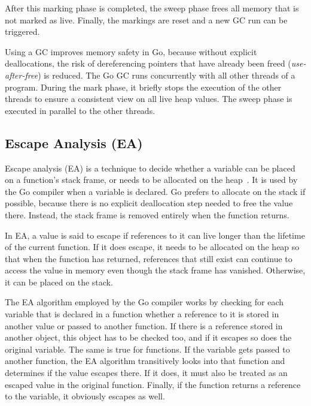 After this marking phase is completed, the sweep phase frees all memory that is not marked as live.
Finally, the markings are reset and a new \acrshort{GC} run can be triggered.

Using a \acrshort{GC} improves memory safety in Go, because without explicit deallocations, the risk of dereferencing
pointers that have already been freed (\textit{use-after-free}) is reduced.
The Go GC runs concurrently with all other threads of a program.
During the mark phase, it briefly stops the execution of the other threads to ensure a consistent view on all live
heap values.
The sweep phase is executed in parallel to the other threads.



\subsection{Escape Analysis (EA)}\label{subsec:background:memory:ea}

Escape analysis (\acrshort{EA}) is a technique to decide whether a variable can be placed on a function's stack frame,
or needs to be allocated on the heap~\cite{choi1999}.
It is used by the Go compiler when a variable is declared.
Go prefers to allocate on the stack if possible, because there is no explicit deallocation step needed to free the value
there.
Instead, the stack frame is removed entirely when the function returns.

In \acrshort{EA}, a value is said to escape if references to it can live longer than the lifetime of the current
function.
If it does escape, it needs to be allocated on the heap so that when the function has returned, references that still
exist can continue to access the value in memory even though the stack frame has vanished.
Otherwise, it can be placed on the stack.

The \acrshort{EA} algorithm employed by the Go compiler works by checking for each variable that is declared in a
function whether a reference to it is stored in another value or passed to another function.
If there is a reference stored in another object, this object has to be checked too, and if it escapes so does the
original variable.
The same is true for functions.
If the variable gets passed to another function, the \acrshort{EA} algorithm transitively looks into that function
and determines if the value escapes there.
If it does, it must also be treated as an escaped value in the original function.
Finally, if the function returns a reference to the variable, it obviously escapes as well.



